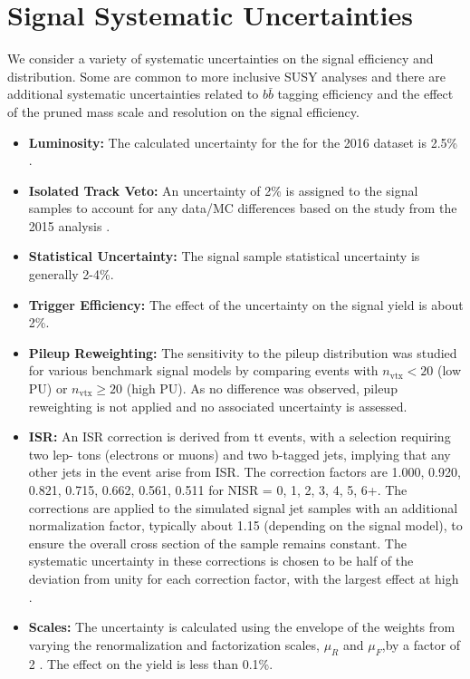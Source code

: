 \section{Signal Systematic Uncertainties}
\label{sec:signalsys}
We consider a variety of systematic uncertainties on the signal efficiency and distribution. Some are common to more 
inclusive SUSY analyses \cite{RA2b:Moriond} and there are additional systematic uncertainties related to $b\bar{b}$ tagging efficiency and 
the effect of the pruned mass scale and resolution on the signal efficiency.  
\begin{itemize}
\item {\bf Luminosity:} The calculated uncertainty for the for the 2016 dataset is 2.5\% \cite{CMS-PAS-LUM-17-001}.
\item {\bf Isolated Track Veto:} An uncertainty of 2\% is assigned to the signal samples to account for any data/MC differences based on the study from the 2015 analysis \cite{RA2b:Moriond}.
\item {\bf Statistical Uncertainty:} The signal sample statistical uncertainty is generally 2-4\%.
\item {\bf Trigger Efficiency:} The effect of the uncertainty on the signal yield is about 2\%.
\item {\bf Pileup Reweighting:} The sensitivity to the pileup distribution was studied for various benchmark signal models by comparing events with $n_{\textrm{vtx}} < 20$ (low PU) or $n_{\textrm{vtx}} \geq 20$ (high PU). As no difference was observed, pileup reweighting is not applied and no associated uncertainty is assessed.
\item {\bf ISR:} An ISR correction is derived from tt events, with a selection requiring two lep-
tons (electrons or muons) and two b-tagged jets, implying that any other jets in the
event arise from ISR. The correction factors are 1.000, 0.920, 0.821, 0.715, 0.662, 0.561,
0.511 for NISR = 0, 1, 2, 3, 4, 5, 6+.
The corrections are applied to the simulated signal jet samples with an additional normalization factor, typically about 1.15 (depending on the signal model), to ensure the overall cross section of the sample remains constant. The systematic uncertainty in these corrections is chosen to be half of the deviation from unity for each correction factor, with the largest effect at high \ptmiss.
\item {\bf Scales:} The uncertainty is calculated using the envelope of the weights from varying the renormalization and factorization scales, $\mu_{R}$ and $\mu_{F}$,by a factor of 2 \cite{Cacciari:2003fi, Catani:2003zt}. The effect on the yield is less than 0.1\%.

\end{itemize}
